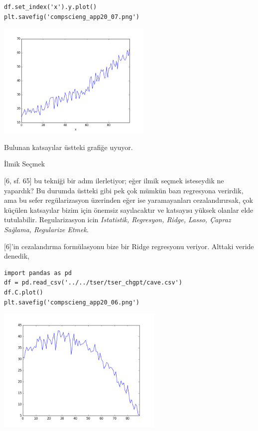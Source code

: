 \documentclass[12pt,fleqn]{article}\usepackage{../../common}
\begin{document}
\begin{verbatim}
df.set_index('x').y.plot()
plt.savefig('compscieng_app20_07.png')
\end{verbatim}

\includegraphics[width=20em]{compscieng_app20_07.png}

Bulunan katsayılar üstteki grafiğe uyuyor. 

İlmik Seçmek

[6, sf. 65] bu tekniği bir adım ilerletiyor; eğer ilmik seçmek isteseydik
ne yapardık? Bu durumda üstteki gibi pek çok mümkün bazı regresyona
verirdik, ama bu sefer regülarizasyon üzerinden eğer ise yaramayanları
cezalandırırsak, çok küçülen katsayılar bizim için önemsiz sayılacaktır ve
katsayısı yüksek olanlar elde tutulabilir. Regularizasyon icin {\em
  Istatistik, Regresyon, Ridge, Lasso, Çapraz Sağlama, Regularize Etmek}.

[6]'in cezalandırma formülasyonu bize bir Ridge regresyonu veriyor. Alttaki
veride denedik,

\begin{verbatim}
import pandas as pd
df = pd.read_csv('../../tser/tser_chgpt/cave.csv')
df.C.plot()
plt.savefig('compscieng_app20_06.png')
\end{verbatim}

\includegraphics[height=6cm]{compscieng_app20_06.png}
\end{document}
